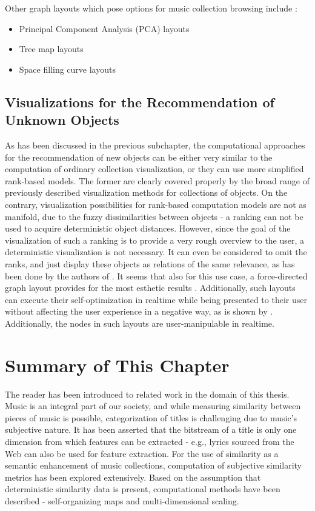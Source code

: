 Other graph layouts which pose options for music collection browsing include \cite{Muelder:2010fk}:

\begin{itemize}
	\item Principal Component Analysis (PCA) layouts 
	\item Tree map layouts 
	\item Space filling curve layouts
\end{itemize}

\subsection{Visualizations for the Recommendation of Unknown Objects}

As has been discussed in the previous subchapter, the computational approaches for the recommendation of new objects can be either very similar to the computation of ordinary collection visualization, or they can use more simplified rank-based models. The former are clearly covered properly by the broad range of previously described visualization methods for collections of objects.
On the contrary, visualization possibilities for rank-based computation models are not as manifold, due to the fuzzy dissimilarities between objects - a ranking can not be used to acquire deterministic object distances. However, since the goal of the visualization of such a ranking is to provide a very rough overview to the user, a deterministic visualization is not necessary. It can even be considered to omit the ranks, and just display these objects as relations of the same relevance, as has been done by the authors of \cite{DBLP:conf/webist/SarmentoGCO09}. It seems that also for this use case, a force-directed graph layout provides for the most esthetic results \cite{DBLP:journals/spe/FruchtermanR91}. Additionally, such layouts can execute their self-optimization in realtime while being presented to their user without affecting the user experience in a negative way, as is shown by \cite{url:tuneglue}. Additionally, the nodes in such layouts are user-manipulable in realtime.

\section{Summary of This Chapter}

The reader has been introduced to related work in the domain of this thesis. Music is an integral part of our society, and while measuring similarity between pieces of music is possible, categorization of titles is challenging due to music's subjective nature. It has been asserted that the bitstream of a title is only one dimension from which features can be extracted - e.g., lyrics sourced from the Web can also be used for feature extraction. For the use of similarity as a semantic enhancement of music collections, computation of subjective similarity metrics has been explored extensively. Based on the assumption that deterministic similarity data is present, computational methods have been described - self-organizing maps and multi-dimensional scaling. 

